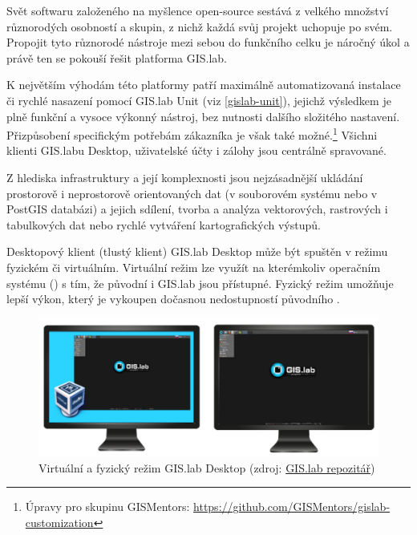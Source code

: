Svět softwaru založeného na myšlence open-source sestává z velkého
množství různorodých osobností a skupin, z nichž každá svůj projekt
uchopuje po svém. Propojit tyto různorodé nástroje mezi sebou do
funkčního celku je náročný úkol a právě ten se pokouší řešit platforma
GIS.lab.

K největším výhodám této platformy patří maximálně automatizovaná
instalace či rychlé nasazení pomocí GIS.lab Unit (viz
\ref{gislab-unit}), jejichž výsledkem je plně funkční a vysoce výkonný
nástroj, bez nutnosti dalšího složitého nastavení. Přizpůsobení
specifickým potřebám zákazníka je však také možné.\footnote{Úpravy pro
  skupinu GISMentors:
  \href{https://github.com/GISMentors/gislab-customization}{https://github.com/GISMentors/gislab-customization}}
Všichni klienti GIS.labu Desktop, uživatelské účty i zálohy jsou
centrálně spravované.

Z hlediska  infrastruktury a její komplexnosti jsou
nejzásadnější ukládání prostorově i neprostorově orientovaných dat (v
souborovém systému nebo v PostGIS databázi) a jejich sdílení, tvorba a
analýza vektorových, rastrových i tabulkových dat nebo rychlé
vytváření kartografických výstupů.

Desktopový klient (tlustý klient) GIS.lab Desktop může být spuštěn v
režimu fyzickém či virtuálním. Virtuální režim lze využít na
kterémkoliv operačním systému () s tím, že původní  i
GIS.lab jsou přístupné. Fyzický režim umožňuje lepší výkon, který je
vykoupen dočasnou nedostupností původního .

\begin{figure}[H] \centering
    \includegraphics[width=450pt]{./pictures/physical-or-virtual-mode.png}
    \caption[Virtuální a fyzický režim GIS.lab Desktop]{Virtuální a fyzický režim GIS.lab Desktop (zdroj:
	\href{https://github.com/gislab-npo/gislab-doc/blob/master/img/installation/physical-or-virtual-mode.png}{GIS.lab repozitář})}
	\label{fig:gislab-rezim}
\end{figure}

